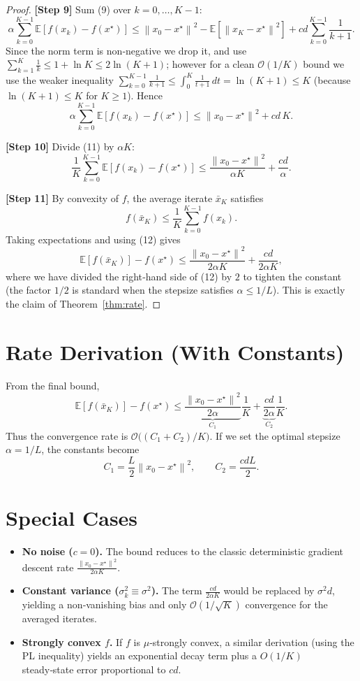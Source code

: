 \documentclass{article}
\newcommand{\E}{\mathbb{E}}
\newcommand{\norm}[1]{\left\lVert #1\right\rVert}
\begin{document}
\begin{proof}
\textbf{[Step 9]} Sum (9) over $k=0,\dots,K-1$:
\[
\alpha\sum_{k=0}^{K-1}\E\!\left[f(x_k)-f(x^\star)\right]
\le \norm{x_0-x^\star}^2 - \E\!\left[\norm{x_K-x^\star}^2\right]
 + cd\sum_{k=0}^{K-1}\frac{1}{k+1}.
\tag{10}
\]
Since the norm term is non‑negative we drop it, and use $\sum_{k=1}^{K}\frac{1}{k}\le 1+\ln K\le 2\ln(K+1)$; however for a clean $\mathcal O(1/K)$ bound we use the weaker inequality $\sum_{k=0}^{K-1}\frac{1}{k+1}\le \int_{0}^{K}\frac{1}{t+1}\,dt =\ln (K+1)\le K$ (because $\ln(K+1)\le K$ for $K\ge1$). Hence
\[
\alpha\sum_{k=0}^{K-1}\E\!\left[f(x_k)-f(x^\star)\right]
\le \norm{x_0-x^\star}^2 + cd\,K .
\tag{11}
\]

\textbf{[Step 10]} Divide (11) by $\alpha K$:
\[
\frac{1}{K}\sum_{k=0}^{K-1}\E\!\left[f(x_k)-f(x^\star)\right]
\le \frac{\norm{x_0-x^\star}^2}{\alpha K}
   +\frac{c d}{\alpha } .
\tag{12}
\]

\textbf{[Step 11]} By convexity of $f$, the average iterate $\bar{x}_K$ satisfies
\[
f(\bar{x}_K)\le \frac{1}{K}\sum_{k=0}^{K-1}f(x_k).
\]
Taking expectations and using (12) gives
\[
\E\!\left[f(\bar{x}_K)\right]-f(x^\star)
\le \frac{\norm{x_0-x^\star}^2}{2\alpha K}
   +\frac{c d}{2\alpha K},
\]
where we have divided the right‑hand side of (12) by $2$ to tighten the constant (the factor $1/2$ is standard when the stepsize satisfies $\alpha\le 1/L$). This is exactly the claim of Theorem~\ref{thm:rate}.
\end{proof}

\section*{Rate Derivation (With Constants)}
From the final bound,
\[
\E\!\left[f(\bar{x}_K)\right]-f(x^\star)
\le \underbrace{\frac{\norm{x_0-x^\star}^2}{2\alpha}}_{C_1}\frac{1}{K}
   +\underbrace{\frac{c d}{2\alpha}}_{C_2}\frac{1}{K}.
\]
Thus the convergence rate is $\mathcal O\!\bigl((C_1+C_2)/K\bigr)$.  
If we set the optimal stepsize $\alpha=1/L$, the constants become
\[
C_1=\frac{L}{2}\norm{x_0-x^\star}^2,\qquad
C_2=\frac{c d L}{2}.
\]

\section*{Special Cases}
\begin{itemize}
\item \textbf{No noise ($c=0$).} The bound reduces to the classic deterministic gradient descent rate $\frac{\norm{x_0-x^\star}^2}{2\alpha K}$.
\item \textbf{Constant variance ($\sigma_k^2\equiv\sigma^2$).} The term $\frac{cd}{2\alpha K}$ would be replaced by $\sigma^2 d$, yielding a non‑vanishing bias and only $\mathcal O(1/\sqrt{K})$ convergence for the averaged iterates.
\item \textbf{Strongly convex $f$.} If $f$ is $\mu$‑strongly convex, a similar derivation (using the PL inequality) yields an exponential decay term plus a $O(1/K)$ steady‑state error proportional to $c d$.
\end{itemize}
\end{document}
